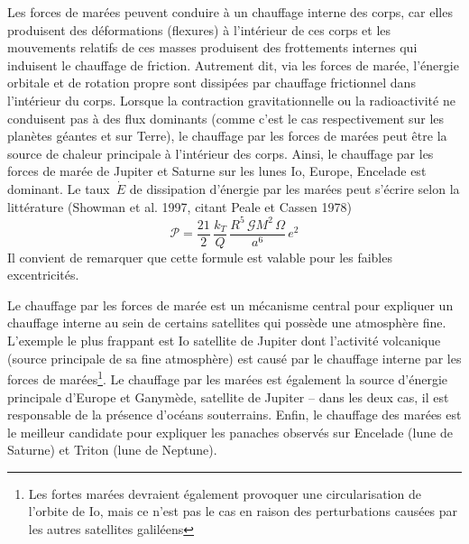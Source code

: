 

\sk
Les forces de marées peuvent conduire à un chauffage interne des corps,
car elles produisent des déformations (flexures) à l'intérieur de ces corps
et les mouvements relatifs de ces masses produisent des frottements internes
qui induisent le chauffage de friction.
Autrement dit, via les forces de marée, l'énergie orbitale et de rotation propre sont dissipées par chauffage frictionnel dans l'intérieur du corps.
Lorsque la contraction gravitationnelle ou la radioactivité ne conduisent
pas à des flux dominants (comme c'est le cas respectivement sur les planètes géantes et sur Terre),
le chauffage par les forces de marées
peut être la source de chaleur principale à l'intérieur des corps.
Ainsi, le chauffage par les forces de marée de Jupiter et Saturne sur 
les lunes Io, Europe, Encelade est dominant.
Le taux~$\dot{E}$ de dissipation d'énergie par les marées peut s'écrire
selon la littérature (Showman et al. 1997, citant Peale et Cassen 1978)
\[ \mathcal{P} = \frac{21}{2} \, \frac{k_T}{Q} \, \frac{R^5\,\mathcal{G}M^2\,\Omega}{a^6} \, e^2 \]
\noindent Il convient de remarquer que cette formule est valable
pour les faibles excentricités.

\sk
Le chauffage par les forces de marée est un mécanisme central pour
expliquer un chauffage interne au sein de certains satellites
qui possède une atmosphère fine. L'exemple le plus frappant
est Io satellite de Jupiter dont l'activité volcanique
(source principale de sa fine atmosphère)
est causé par le chauffage interne par les forces de 
marées\footnote{Les fortes marées devraient également provoquer
une circularisation de l'orbite de Io, mais ce n'est pas le cas
en raison des perturbations causées par les autres satellites galiléens}.
Le chauffage par les marées est également la source d'énergie
principale d'Europe et Ganymède, satellite de Jupiter -- dans les
deux cas, il est responsable de la présence d'océans souterrains.
Enfin, le chauffage des marées est le meilleur candidate pour
expliquer les panaches observés sur Encelade (lune de Saturne)
et Triton (lune de Neptune).









